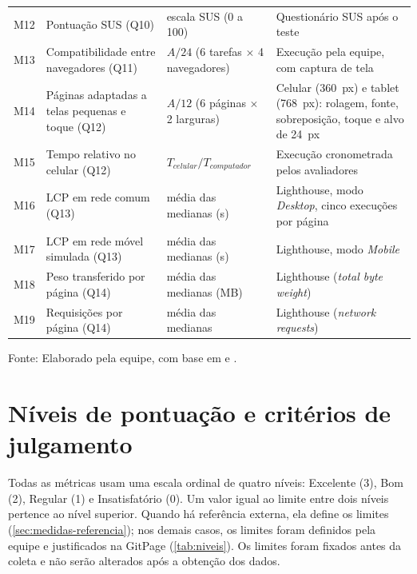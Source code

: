 {\begin{longtable}{L{0.6cm} L{3.6cm} L{4.5cm} L{5.6cm}}
	M12 & Pontuação SUS (Q10) & escala SUS (0 a 100) & Questionário SUS após o teste \cite{brooke1996} \\
	M13 & Compatibilidade entre navegadores (Q11) & $A/24$ (6 tarefas $\times$ 4 navegadores) & Execução pela equipe, com captura de tela \\
	M14 & Páginas adaptadas a telas pequenas e toque (Q12) & $A/12$ (6 páginas $\times$ 2 larguras) & Celular (360~px) e tablet (768~px): rolagem, fonte, sobreposição, toque e alvo de 24~px \\
	M15 & Tempo relativo no celular (Q12) & $T_{celular} / T_{computador}$ & Execução cronometrada pelos avaliadores \\
	M16 & LCP em rede comum (Q13) & média das medianas (s) & Lighthouse, modo \textit{Desktop}, cinco execuções por página \cite{lighthouse} \\
	M17 & LCP em rede móvel simulada (Q13) & média das medianas (s) & Lighthouse, modo \textit{Mobile} \\
	M18 & Peso transferido por página (Q14) & média das medianas (MB) & Lighthouse (\textit{total byte weight}) \\
	M19 & Requisições por página (Q14) & média das medianas & Lighthouse (\textit{network requests}) \\
\end{longtable}
}
\vspace{-0.6cm}
\begin{center}\small Fonte: Elaborado pela equipe, com base em  e .\end{center}

\section{Níveis de pontuação e critérios de julgamento}
\label{sec:niveis}

Todas as métricas usam uma escala ordinal de quatro níveis: Excelente (3), Bom (2), Regular (1) e Insatisfatório (0). Um valor igual ao limite entre dois níveis pertence ao nível superior. Quando há referência externa, ela define os limites (\autoref{sec:medidas-referencia}); nos demais casos, os limites foram definidos pela equipe e justificados na GitPage (\autoref{tab:niveis}). Os limites foram fixados antes da coleta e não serão alterados após a obtenção dos dados.

